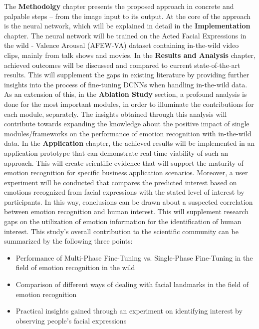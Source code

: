 The \textbf{Methodolgy} chapter presents the proposed approach in concrete and palpable steps -- from the image input to its output. At the core of the approach is the neural network, which will be explained in detail in the \textbf{Implementation} chapter. The neural network will be trained on the Acted Facial Expressions in the wild - Valence Arousal (AFEW-VA) dataset containing in-the-wild video clips, mainly from talk shows and movies.
\newline\newline
In the \textbf{Results and Analysis} chapter, achieved outcomes will be discussed and compared to current state-of-the-art results. This will supplement the gaps in existing literature by providing further insights into the process of fine-tuning DCNNs when handling in-the-wild data. As an extension of this, in the \textbf{Ablation Study} section, a profound analysis is done for the most important modules, in order to illuminate the contributions for each module, separately. The insights obtained through this analysis will contribute towards expanding the knowledge about the positive impact of single modules/frameworks on the performance of emotion recognition with in-the-wild data.
\newline\newline
In the \textbf{Application} chapter, the achieved results will be implemented in an application prototype that can demonstrate real-time viability of such an approach. This will create scientific evidence that will support the maturity of emotion recognition for specific business application scenarios.\newline
Moreover, a user experiment will be conducted that compares the predicted interest based on emotions recognized from facial expressions with the stated level of interest by participants. In this way, conclusions can be drawn about a suspected correlation between emotion recognition and human interest. This will supplement research gaps on the utilization of emotion information for the identification of human interest. 
\newline\newline
This study's overall contribution to the scientific community can be summarized by the following three points:
\begin{itemize}
    \item Performance of Multi-Phase Fine-Tuning vs. Single-Phase Fine-Tuning in the field of emotion recognition in the wild
    \item Comparison of different ways of dealing with facial landmarks in the field of emotion recognition
    \item Practical insights gained through an experiment on identifying interest by observing people's facial expressions
\end{itemize}